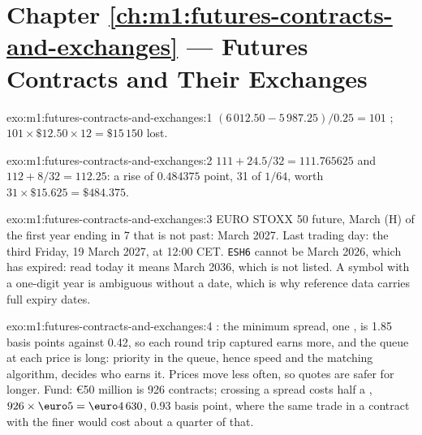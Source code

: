 \section*{Chapter \ref{ch:m1:futures-contracts-and-exchanges} --- Futures Contracts and Their Exchanges}

\begin{solution}{exo:m1:futures-contracts-and-exchanges:1}
$(6\,012.50 - 5\,987.25)/0.25 = 101$ ; $101 \times \$12.50 \times 12 =
\$15\,150$ lost.
\end{solution}

\begin{solution}{exo:m1:futures-contracts-and-exchanges:2}
$111 + 24.5/32 = 111.765625$ and $112 + 8/32 = 112.25$: a rise of $0.484375$
point, 31  of $1/64$, worth $31 \times \$15.625 = \$484.375$.
\end{solution}

\begin{solution}{exo:m1:futures-contracts-and-exchanges:3}
EURO STOXX 50 future, March (H) of the first year ending in 7 that is not
past: March 2027. Last trading day: the third Friday, 19 March 2027, at 12:00
CET. \texttt{ESH6} cannot be March 2026, which has expired: read today it
means March 2036, which is not listed. A symbol with a one-digit year is
ambiguous without a date, which is why reference data carries full expiry
dates.
\end{solution}

\begin{solution}{exo:m1:futures-contracts-and-exchanges:4}
: the minimum spread, one , is 1.85 basis points against
0.42, so each round trip captured earns more, and the queue at each price is
long: priority in the queue, hence speed and the matching algorithm, decides
who earns it. Prices move less often, so quotes are safer for longer. Fund:
\euro50 million is 926 contracts; crossing a  spread costs half a
, $926 \times \text{\euro}5 = \text{\euro}4\,630$, 0.93 basis point, where the
same trade in a contract with the finer  would cost about a quarter of
that.
\end{solution}

